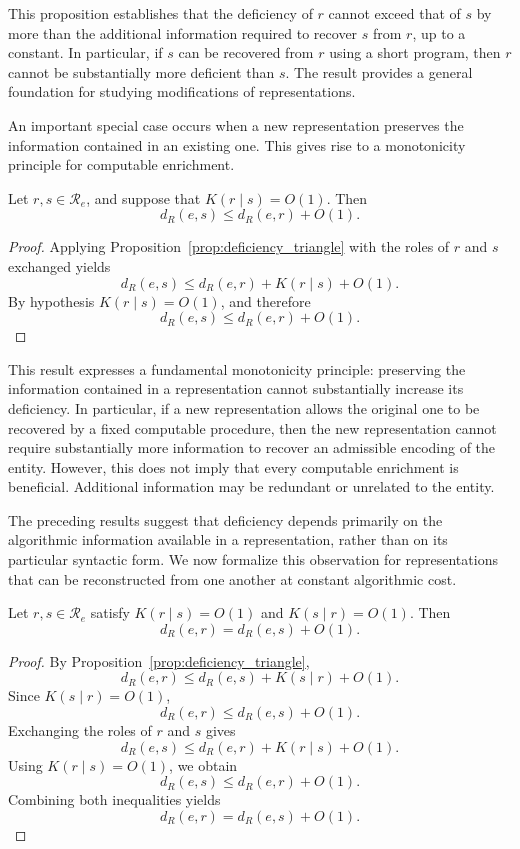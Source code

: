 This proposition establishes that the deficiency of $r$ cannot exceed that of $s$ by more than the additional information required to recover $s$ from $r$, up to a constant. In particular, if $s$ can be recovered from $r$ using a short program, then $r$ cannot be substantially more deficient than $s$. The result provides a general foundation for studying modifications of representations. 

An important special case occurs when a new representation preserves the information contained in an existing one. This gives rise to a monotonicity principle for computable enrichment.

\begin{proposition}
\label{prop:deficiency_enrichment}
Let $r,s\in\mathcal R_e$, and suppose that $K(r\mid s)=O(1)$. Then
\[
d_R(e,s)\le d_R(e,r)+O(1).
\]
\end{proposition}
\begin{proof}
Applying Proposition~\ref{prop:deficiency_triangle} with the roles of $r$ and $s$ exchanged yields
\[
d_R(e,s) \le d_R(e,r) + K(r\mid s) + O(1).
\]
By hypothesis $K(r\mid s)=O(1)$, and therefore
\[
d_R(e,s)\le d_R(e,r)+O(1).
\]
\end{proof}

This result expresses a fundamental monotonicity principle: preserving the information contained in a representation cannot substantially increase its deficiency. In particular, if a new representation allows the original one to be recovered by a fixed computable procedure, then the new representation cannot require substantially more information to recover an admissible encoding of the entity. However, this does not imply that every computable enrichment is beneficial. Additional information may be redundant or unrelated to the entity.

The preceding results suggest that deficiency depends primarily on the algorithmic information available in a representation, rather than on its particular syntactic form. We now formalize this observation for representations that can be reconstructed from one another at constant algorithmic cost.

\begin{proposition}
\label{prop:deficiency_algorithmic_equivalence}
Let $r,s\in\mathcal R_e$ satisfy $K(r\mid s)=O(1)$ and $K(s\mid r)=O(1)$. Then
\[
d_R(e,r)=d_R(e,s)+O(1).
\]
\end{proposition}
\begin{proof}
By Proposition~\ref{prop:deficiency_triangle},
\[
d_R(e,r) \le d_R(e,s) + K(s\mid r) + O(1).
\]
Since $K(s\mid r)=O(1)$,
\[
d_R(e,r)\le d_R(e,s)+O(1).
\]
Exchanging the roles of $r$ and $s$ gives
\[
d_R(e,s) \le d_R(e,r) + K(r\mid s) + O(1).
\]
Using $K(r\mid s)=O(1)$, we obtain
\[
d_R(e,s)\le d_R(e,r)+O(1).
\]
Combining both inequalities yields
\[
d_R(e,r)=d_R(e,s)+O(1).
\]
\end{proof}


